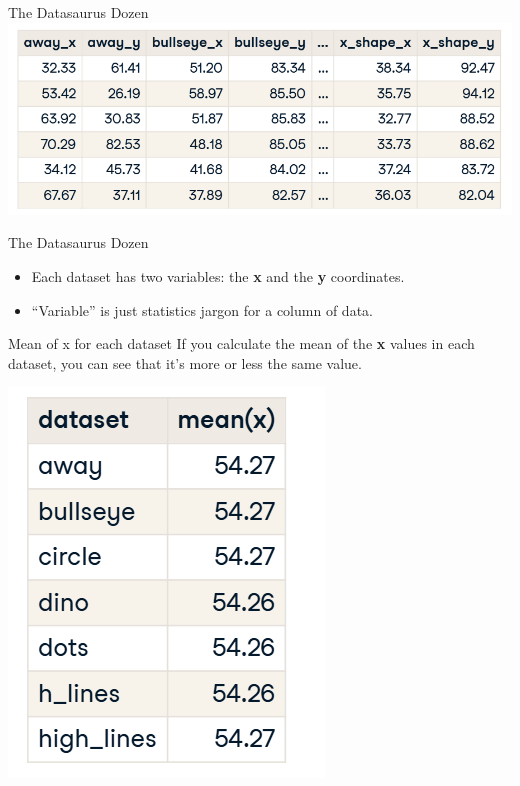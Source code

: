 \documentclass[
  ignorenonframetext,
]{beamer}
\begin{document}
\begin{frame}{The Datasaurus Dozen}
\label{the-datasaurus-dozen-1}
\includegraphics{../images/im1.png}
\end{frame}

\begin{frame}{The Datasaurus Dozen}
\label{the-datasaurus-dozen-2}
\begin{itemize}
\item
  Each dataset has two variables: the \textbf{x} and the \textbf{y}
  coordinates.
\item
  ``Variable'' is just statistics jargon for a column of data.
\end{itemize}
\end{frame}

\begin{frame}{Mean of x for each dataset}
\label{mean-of-x-for-each-dataset}
If you calculate the mean of the \textbf{x} values in each dataset, you
can see that it's more or less the same value.

\includegraphics{../images/im2.png}
\end{frame}
\end{document}
